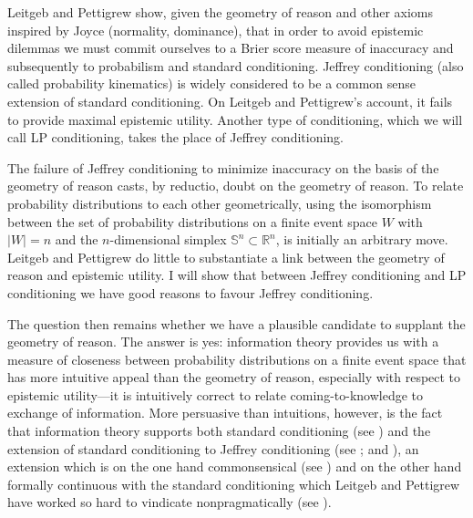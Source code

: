 \documentclass[11pt]{article}
\begin{document}
Leitgeb and Pettigrew show, given the geometry of reason and other
axioms inspired by Joyce (normality, dominance), that in
order to avoid epistemic dilemmas we must commit ourselves to a Brier
score measure of inaccuracy and subsequently to probabilism and
standard conditioning. Jeffrey conditioning (also called probability
kinematics) is widely considered to be a common sense extension of
standard conditioning. On Leitgeb and Pettigrew's account, it fails to
provide maximal epistemic utility. Another type of conditioning, which
we will call LP conditioning, takes the place of Jeffrey conditioning.

The failure of Jeffrey conditioning to minimize inaccuracy on the
basis of the geometry of reason casts, by reductio, doubt on the
geometry of reason. To relate probability distributions to each other
geometrically, using the isomorphism between the set of probability
distributions on a finite event space $W$ with $|W|=n$ and the
$n$-dimensional simplex $\mathbb{S}^{n}\subset\mathbb{R}^{n}$, is
initially an arbitrary move. Leitgeb and Pettigrew do little to
substantiate a link between the geometry of reason and epistemic
utility. I will show that between Jeffrey conditioning and LP
conditioning we have good reasons to favour Jeffrey conditioning.

The question then remains whether we have a plausible candidate to
supplant the geometry of reason. The answer is yes: information theory
provides us with a measure of closeness between probability
distributions on a finite event space that has more intuitive appeal
than the geometry of reason, especially with respect to epistemic
utility---it is intuitively correct to relate coming-to-knowledge to
exchange of information. More persuasive than intuitions, however, is
the fact that information theory supports both standard conditioning
(see ) and the extension of standard
conditioning to Jeffrey conditioning (see
; and ), an extension
which is on the one hand commonsensical (see )
and on the other hand formally continuous with the standard
conditioning which Leitgeb and Pettigrew have worked so hard to
vindicate nonpragmatically (see ).
\end{document}
